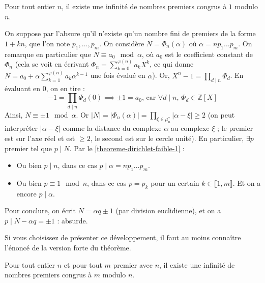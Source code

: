 	\begin{theorem}
		Pour tout entier $n$, il existe une infinité de nombres premiers congrus à $1$ modulo $n$.
	\end{theorem}
	
	\begin{demonstration}
		On suppose par l'absure qu'il n'existe qu'un nombre fini de premiers de la forme $1+kn$, que l'on note $p_1, \dots, p_m$. On considère $N = \Phi_n(\alpha)$ où $\alpha = n p_1 \dots p_m$. On remarque en particulier que $N \equiv a_0 \mod \alpha$, où $a_0$ est le coefficient constant de $\Phi_n$ (cela se voit en écrivant $\Phi_n = \sum_{k=0}^{\varphi(n)} a_k X^k$, ce qui donne $N = a_0 + \alpha \sum_{k=1}^{\varphi(n)} a_k \alpha^{k-1}$ une fois évalué en $\alpha$).
		\newpar
		Or, $X^n - 1 = \prod_{d \mid n} \Phi_d$. En évaluant en $0$, on en tire :
		\[ -1 = \prod_{d \mid n} \Phi_d(0) \implies \pm 1 = a_0 \text{, car } \forall d \mid n, \, \Phi_d \in \mathbb{Z}[X] \]
		Ainsi, $N \equiv \pm 1 \mod \alpha$. Or $|N| = |\Phi_n(\alpha)| = \prod_{\xi \in \mu_n^*} |\alpha - \xi| \geq 2$ (on peut interpréter $|\alpha - \xi|$ comme la distance du complexe $\alpha$ au complexe $\xi$ ; le premier est sur l'axe réel et est $\geq 2$, le second est sur le cercle unité).
		\newpar
		En particulier, $\exists p$ premier tel que $p \mid N$. Par le \cref{theoreme-dirichlet-faible-1} :
		\begin{itemize}
			\item Ou bien $p \mid n$, dans ce cas $p \mid \alpha = n p_1 \dots p_m$.
			\item Ou bien $p \equiv 1 \mod n$, dans ce cas $p = p_k$ pour un certain $k \in \llbracket 1, m \rrbracket$. Et on a encore $p \mid \alpha$.
		\end{itemize}
		Pour conclure, on écrit $N = \alpha q \pm 1$ (par division euclidienne), et on a $p \mid N - \alpha q = \pm 1$ : absurde.
	\end{demonstration}
	
	\begin{remark}
		Si vous choisissez de présenter ce développement, il faut au moins connaître l'énoncé de la version forte du théorème.
	\end{remark}
	
	\begin{theorem}
		Pour tout entier $n$ et pour tout $m$ premier avec $n$, il existe une infinité de nombres premiers congrus à $m$ modulo $n$.
	\end{theorem}
